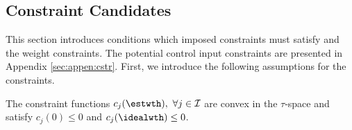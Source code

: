 \documentclass[lettersize,journal]{IEEEtran}
\begin{document}


\subsection{Constraint Candidates}\label{sec:sub:cstr} 

This section introduces conditions which imposed constraints must satisfy and the weight constraints.
The potential control input constraints are presented in Appendix \ref{sec:appen:cstr}.
First, we introduce the following assumptions for the constraints.

\begin{assum}
    The constraint functions $c_j(\estwth),\ \forall j\in\mathcal I$ are convex in the $\tau$-space and satisfy $c_j(0) \le 0$ and $c_j(\idealwth)\le 0$.
    \label{assum:convex}
\end{assum}
\end{document}
